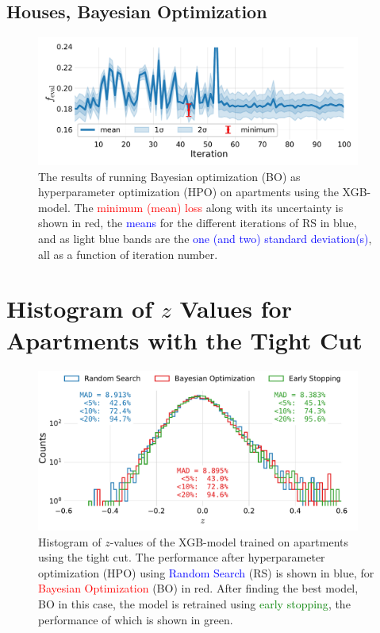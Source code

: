 \subsection*{Houses, Bayesian Optimization}
\begin{figure}[h!]
  \includegraphics[width=0.95\textwidth, trim=0 0 0 0, clip]{figures/housing/Villa_v19_cut_all_Ncols_all_xgb_score_over_time_BO.pdf}
  \caption[Bayesian Optimization Results as a Function of Iteration for Houses]
          {The results of running Bayesian optimization (BO) as hyperparameter optimization (HPO) on apartments using the XGB-model. The \textcolor{red}{minimum (mean) loss} along with its uncertainty is shown in red, the \textcolor{blue}{means} for the different iterations of RS in blue, and as light blue bands are the \textcolor{blue}{one (and two) standard deviation(s)}, all as a function of iteration number.} 
\end{figure}
\clearpage

\FloatBarrier
\section[Histogram of z Values for Apartments with the Tight Cut]{Histogram of $z$ Values for Apartments with the Tight Cut}
\begin{figure}
  \includegraphics[width=0.95\textwidth, trim=0 0 0 0, clip]{figures/housing/Ejerlejlighed_v19_cut_all_Ncols_all_xgb_z_hist_metrics_tight.pdf}
  \caption[Performance of XGB-model on apartment prices]
          {Histogram of $z$-values of the XGB-model trained on apartments using the tight cut. The performance after hyperparameter optimization (HPO) using \textcolor{blue}{Random Search} (RS) is shown in blue, for \textcolor{red}{Bayesian Optimization} (BO) in red. After finding the best model, BO in this case, the model is retrained using \textcolor{green}{early stopping}, the performance of which is shown in green.} 
  \label{fig:h:CV_res_performance_ejer_tight}
\end{figure}
\vspace{3cm}
\FloatBarrier
